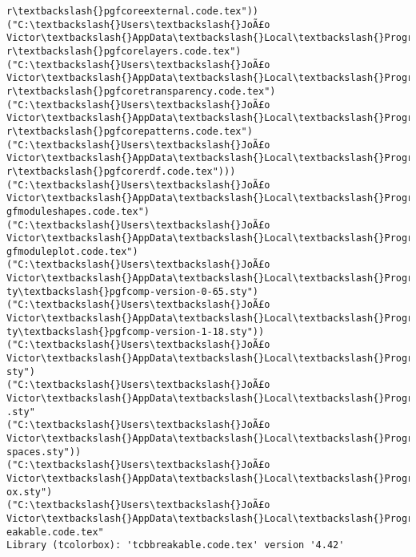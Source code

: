 \documentclass[11pt]{article}
\begin{document}
\begin{Verbatim}[commandchars=\\\{\}]
r\textbackslash{}pgfcoreexternal.code.tex"))
("C:\textbackslash{}Users\textbackslash{}JoÃ£o Victor\textbackslash{}AppData\textbackslash{}Local\textbackslash{}Programs\textbackslash{}MiKTeX\textbackslash{}tex/generic/pgf/basiclaye
r\textbackslash{}pgfcorelayers.code.tex")
("C:\textbackslash{}Users\textbackslash{}JoÃ£o Victor\textbackslash{}AppData\textbackslash{}Local\textbackslash{}Programs\textbackslash{}MiKTeX\textbackslash{}tex/generic/pgf/basiclaye
r\textbackslash{}pgfcoretransparency.code.tex")
("C:\textbackslash{}Users\textbackslash{}JoÃ£o Victor\textbackslash{}AppData\textbackslash{}Local\textbackslash{}Programs\textbackslash{}MiKTeX\textbackslash{}tex/generic/pgf/basiclaye
r\textbackslash{}pgfcorepatterns.code.tex")
("C:\textbackslash{}Users\textbackslash{}JoÃ£o Victor\textbackslash{}AppData\textbackslash{}Local\textbackslash{}Programs\textbackslash{}MiKTeX\textbackslash{}tex/generic/pgf/basiclaye
r\textbackslash{}pgfcorerdf.code.tex")))
("C:\textbackslash{}Users\textbackslash{}JoÃ£o Victor\textbackslash{}AppData\textbackslash{}Local\textbackslash{}Programs\textbackslash{}MiKTeX\textbackslash{}tex/generic/pgf/modules\textbackslash{}p
gfmoduleshapes.code.tex")
("C:\textbackslash{}Users\textbackslash{}JoÃ£o Victor\textbackslash{}AppData\textbackslash{}Local\textbackslash{}Programs\textbackslash{}MiKTeX\textbackslash{}tex/generic/pgf/modules\textbackslash{}p
gfmoduleplot.code.tex")
("C:\textbackslash{}Users\textbackslash{}JoÃ£o Victor\textbackslash{}AppData\textbackslash{}Local\textbackslash{}Programs\textbackslash{}MiKTeX\textbackslash{}tex/latex/pgf/compatibili
ty\textbackslash{}pgfcomp-version-0-65.sty")
("C:\textbackslash{}Users\textbackslash{}JoÃ£o Victor\textbackslash{}AppData\textbackslash{}Local\textbackslash{}Programs\textbackslash{}MiKTeX\textbackslash{}tex/latex/pgf/compatibili
ty\textbackslash{}pgfcomp-version-1-18.sty"))
("C:\textbackslash{}Users\textbackslash{}JoÃ£o Victor\textbackslash{}AppData\textbackslash{}Local\textbackslash{}Programs\textbackslash{}MiKTeX\textbackslash{}tex/latex/tools\textbackslash{}verbatim.
sty")
("C:\textbackslash{}Users\textbackslash{}JoÃ£o Victor\textbackslash{}AppData\textbackslash{}Local\textbackslash{}Programs\textbackslash{}MiKTeX\textbackslash{}tex/latex/environ\textbackslash{}environ
.sty"
("C:\textbackslash{}Users\textbackslash{}JoÃ£o Victor\textbackslash{}AppData\textbackslash{}Local\textbackslash{}Programs\textbackslash{}MiKTeX\textbackslash{}tex/latex/trimspaces\textbackslash{}trim
spaces.sty"))
("C:\textbackslash{}Users\textbackslash{}JoÃ£o Victor\textbackslash{}AppData\textbackslash{}Local\textbackslash{}Programs\textbackslash{}MiKTeX\textbackslash{}tex/latex/etoolbox\textbackslash{}etoolb
ox.sty")
("C:\textbackslash{}Users\textbackslash{}JoÃ£o Victor\textbackslash{}AppData\textbackslash{}Local\textbackslash{}Programs\textbackslash{}MiKTeX\textbackslash{}tex/latex/tcolorbox\textbackslash{}tcbbr
eakable.code.tex"
Library (tcolorbox): 'tcbbreakable.code.tex' version '4.42'


\end{Verbatim}
\end{document}
